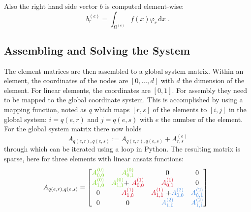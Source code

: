 \documentclass[%
  a4paper,oneside,%
  11pt,%
  smallchapters,
  green,%
  rgb, <cmyk>
  ,]{tubsbook}
\begin{document}
Also the right hand side vector $b$ is computed element-wise:
\begin{equation}
b_r^{(e)} = \int_{\Omega^{(e)}} f(x) \varphi_r \, \mathrm{d}x \; .
\end{equation}


\subsection{Assembling and Solving the System}

The element matrices are then assembled to a global system matrix. Within an element, the coordinates of the nodes are $[0,...,d]$ with $d$ the dimension of the element. For linear elements, the coordinates are $[0,1]$. For assembly they need to be mapped to the global coordinate system. This is accomplished by using a mapping function, noted as $q$ which maps $[r,s]$ of the elements to $[i,j]$ in the global system: $i=q(e,r)$ and $j = q(e,s)$ with $e$ the number of the element. For the global system matrix there now holds
\begin{equation}
A_{q(e,r), q(e,s)} := A_{q(e,r), q(e,s)} + A_{r,s}^{(e)}
\end{equation}
through which can be iterated using a loop in Python. 
The resulting matrix is sparse, here for three elements with linear ansatz functions:
\begin{equation}
A_{q(e,r), q(e,s)}  =
\begin{bmatrix}
\textcolor[rgb]{0.49,0.83,0.13}{A_{0,0}^{( 0)}} & \textcolor[rgb]{0.49,0.83,0.13}{A}\textcolor[rgb]{0.49,0.83,0.13}{_{0,1}^{( 0)}} & 0 & 0\\
\textcolor[rgb]{0.49,0.83,0.13}{A}\textcolor[rgb]{0.49,0.83,0.13}{_{1,0}^{( 0)}} & \textcolor[rgb]{0.49,0.83,0.13}{A}\textcolor[rgb]{0.49,0.83,0.13}{_{1,1}^{( 0)}}\textcolor[rgb]{0,0,0}{+}\textcolor[rgb]{0.49,0.83,0.13}{\ }\textcolor[rgb]{0.82,0.01,0.11}{A_{0,0}^{( 1)}} & \textcolor[rgb]{0.82,0.01,0.11}{A}\textcolor[rgb]{0.82,0.01,0.11}{_{0,1}^{( 1)}} & 0\\
0 & \textcolor[rgb]{0.82,0.01,0.11}{A}\textcolor[rgb]{0.82,0.01,0.11}{_{1,0}^{( 1)}} & \textcolor[rgb]{0.82,0.01,0.11}{A}\textcolor[rgb]{0.82,0.01,0.11}{_{1,1}^{( 1)} \ }\textcolor[rgb]{0,0,0}{+}\textcolor[rgb]{0.29,0.56,0.89}{A_{0,0}^{( 2)}} & \textcolor[rgb]{0.29,0.56,0.89}{A}\textcolor[rgb]{0.29,0.56,0.89}{_{0,1}^{( 2)}}\\
0 & 0 & \textcolor[rgb]{0.29,0.56,0.89}{A}\textcolor[rgb]{0.29,0.56,0.89}{_{1,0}^{( 2)}} & \textcolor[rgb]{0.29,0.56,0.89}{A}\textcolor[rgb]{0.29,0.56,0.89}{_{1,1}^{( 2)}}
\end{bmatrix} \ \ 
\end{equation}
\end{document}
